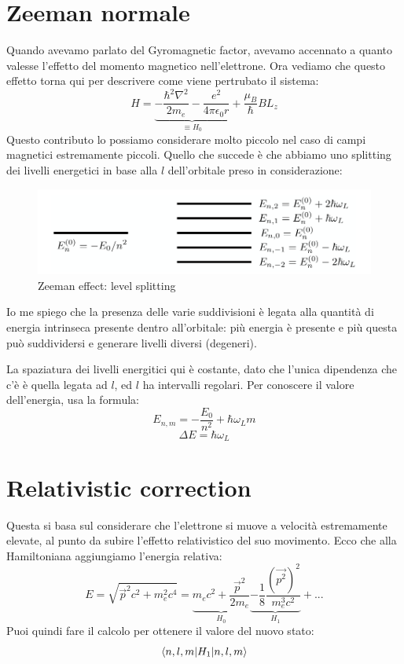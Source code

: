\section{Zeeman normale}
Quando avevamo parlato del Gyromagnetic factor, avevamo accennato a quanto valesse l'effetto del momento magnetico nell'elettrone. Ora vediamo che questo effetto torna qui per descrivere come viene pertrubato il sistema:
$$H = \underbrace{-\frac{\hbar^2 \nabla^2}{2m_e} - \frac{e^2}{4\pi\epsilon_0 r}}_{\equiv H_0} + \frac{\mu_B}{\hbar} B L_z$$
Questo contributo lo possiamo considerare molto piccolo nel caso di campi magnetici estremamente piccoli. Quello che succede è che abbiamo uno splitting dei livelli energetici in base alla $l$ dell'orbitale preso in considerazione:

\begin{figure}[ht]
	\centering
	\includegraphics[width=1\textwidth]{../images/Screenshot 2025-02-21 165431.png}
	\caption{Zeeman effect: level splitting}
	\label{fig:zeeman_normal}
\end{figure}

Io me spiego che la presenza delle varie suddivisioni è legata alla quantità di energia intrinseca presente dentro all'orbitale: più energia è presente e più questa può suddividersi e generare livelli diversi (degeneri).

La spaziatura dei livelli energitici qui è costante, dato che l'unica dipendenza che c'è è quella legata ad $l$, ed $l$ ha intervalli regolari. Per conoscere il valore dell'energia, usa la formula:
$$E_{n,m} = -\frac{E_0}{n^2}+ \hbar\omega_Lm$$
$$\Delta E = \hbar\omega_L$$

\section{Relativistic correction}

Questa si basa sul considerare che l'elettrone si muove a velocità estremamente elevate, al punto da subire l'effetto relativistico del suo movimento. Ecco che alla Hamiltoniana aggiungiamo l'energia relativa:
$$E = \sqrt{\vec{p}^2c^2 + m_e^2c^4} = \underbrace{m_ec^2 + \frac{\vec{p}^2}{2m_e}}_{H_0} \underbrace{- \frac{1}{8}\frac{(\vec{p^2})^2}{m_e^3c^2}}_{H_1} + ...$$
Puoi quindi fare il calcolo per ottenere il valore del nuovo stato:
$$\braket{n,l,m|H_1|n,l,m}$$


